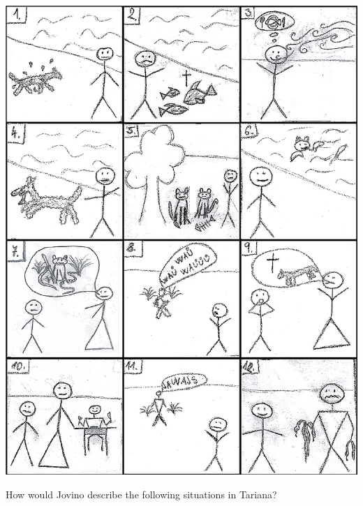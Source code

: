 \begin{refsection}
\begin{problem}{\langnameTariana}{\nameMSvatosova}{}
\vfill
\noindent\includegraphics[width=\linewidth]{images/Tariana_main.png}
\vfill

\begin{assgts}
\item \detcorr
\item How would Jovino describe the following situations in Tariana?


\end{assgts}
\end{problem}
\end{refsection}
